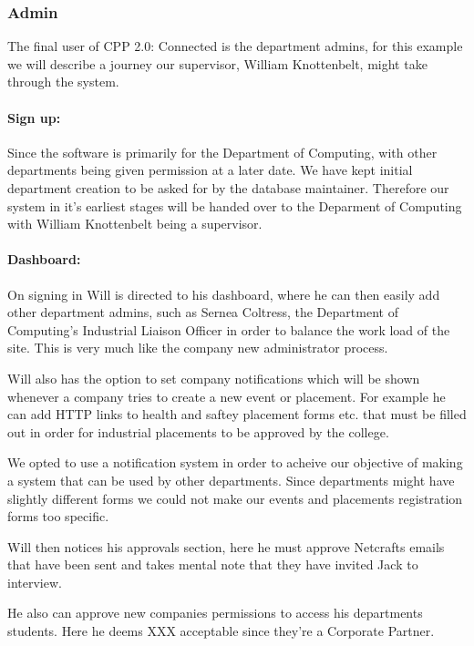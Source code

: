\subsubsection{Admin}
  The final user of CPP 2.0: Connected is the department admins, for this example we will describe a journey our supervisor, William Knottenbelt, might take through the system.
  \paragraph{Sign up:}
    Since the software is primarily for the Department of Computing, with other departments being given permission at a later date. We have kept initial department creation to be asked for by the database maintainer. 
    Therefore our system in it's earliest stages will be handed over to the Deparment of Computing with William Knottenbelt being a supervisor. 

  \paragraph{Dashboard:}
    On signing in Will is directed to his dashboard, where he can then easily add other department admins, such as Sernea Coltress, the Department of Computing's Industrial Liaison Officer in order to balance the work load of the site. This is very much like the company new administrator process.


    Will also has the option to set company notifications which will be shown whenever a company tries to create a new event or placement. For example he can add HTTP links to health and saftey placement forms etc. that must be filled out in order for industrial placements to be approved by the college. 

    We opted to use a notification system in order to acheive our objective of making a system that can be used by other departments. Since departments might have slightly different forms we could not make our events and placements registration forms too specific.

    Will then notices his approvals section, here he must approve Netcrafts emails that have been sent and takes mental note that they have invited Jack to interview. 

    He also can approve new companies permissions to access his departments students. Here he deems XXX acceptable since they're a Corporate Partner.

